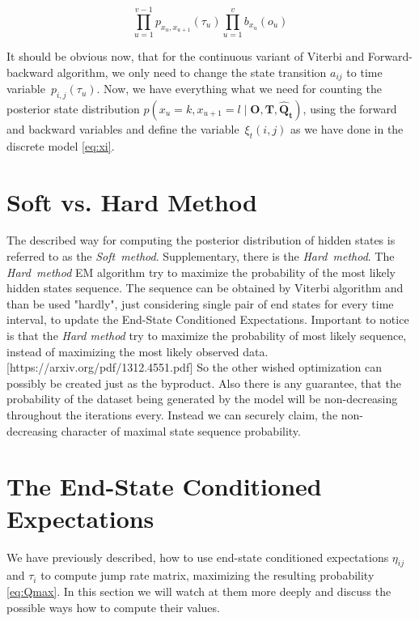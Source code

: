 \documentclass[thesis=M,english]{FITthesis}[2012/10/20]
\newcommand{\matr}[1]{\mathbf{#1}}
\begin{document}
\begin{equation}
\prod_{u=1}^{v-1} p_{x_u, x_{u+1}}(\tau_u) \prod_{u=1}^{v} b_{ x_u }(o_u)
\end{equation}

It should be obvious now, that for the continuous variant of Viterbi and Forward-backward algorithm, we only need to change the state transition $a_{ij}$ to time variable~$p_{i,j}( \tau_u )$.   
Now, we have everything what we need for counting the posterior state distribution $p( x_u = k, x_{u+1} = l \mid \matr{O},\matr{T}, \matr{ \hat Q_t } )$, using the forward and backward variables and define the variable~$\xi_t(i,j)$ as we have done in the discrete model \eqref{eq:xi}.

\section{Soft vs. Hard Method}\label{sec:shm}

The described way for computing the posterior distribution of hidden states is referred to as the \textit{Soft~method}. Supplementary, there is the \textit{Hard~method}. The \textit{Hard~method} EM algorithm try to maximize the probability of the most likely hidden states sequence. The sequence can be obtained by Viterbi algorithm and than be used "hardly", just considering single pair of end states for every time interval, to update the End-State Conditioned Expectations. Important to notice is that the \textit{Hard method} try to maximize the probability of most likely sequence, instead of maximizing the most likely observed data. [https://arxiv.org/pdf/1312.4551.pdf] So the other wished optimization can possibly be created just as the byproduct. Also there is any guarantee, that the probability of the dataset being generated by the model will be non-decreasing throughout the iterations every. Instead we can securely claim, the non-decreasing character of maximal state sequence probability.           

\section{The End-State Conditioned Expectations}\label{sec:endexp}

We have previously described, how to use end-state conditioned expectations $\eta_{ij}$ and $\tau_i$ to compute jump rate matrix, maximizing the resulting probability \eqref{eq:Qmax}. In this section we will watch at them more deeply and discuss the possible ways how to compute their values.
\end{document}
